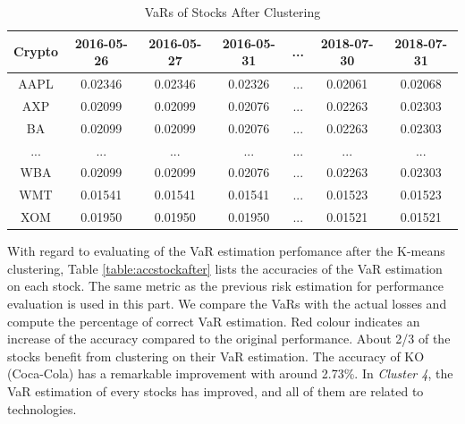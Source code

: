 \documentclass[11pt]{article} %
\theoremstyle{plain}
\theoremstyle{definition}
\begin{document}
{
  \begin{table}[ht]
    \centering
    \small
    \begin{tabular}{|c|c c c c c c|}
        \hline
        Crypto & 2016-05-26 & 2016-05-27 & 2016-05-31 & ... & 2018-07-30 & 2018-07-31 \\ [0.5ex]
        \hline
        AAPL & 0.02346 & 0.02346 & 0.02326 & ... & 0.02061 & 0.02068 \\
        \hline
        AXP & 0.02099 & 0.02099 & 0.02076 & ... & 0.02263 & 0.02303 \\
        \hline
        BA & 0.02099 & 0.02099 & 0.02076 & ... & 0.02263 & 0.02303 \\
        \hline
        ... & ... & ... & ... & ... & ... & ... \\
        \hline
        WBA & 0.02099 & 0.02099 & 0.02076 & ... & 0.02263 & 0.02303 \\
        \hline
        WMT & 0.01541 & 0.01541 & 0.01541 & ... & 0.01523 & 0.01523 \\
        \hline
        XOM & 0.01950 & 0.01950 & 0.01950 & ... & 0.01521 & 0.01521 \\
        \hline
    \end{tabular}
    \caption{VaRs of Stocks After Clustering}
    \label{table:varstockafter}
  \end{table}
}

With regard to evaluating of the VaR estimation perfomance after the K-means clustering, Table \ref{table:accstockafter} lists the accuracies of the VaR estimation on each stock. The same metric as the previous risk estimation for performance evaluation is used in this part. We compare the VaRs with the actual losses and compute the percentage of correct VaR estimation. Red colour indicates an increase of the accuracy compared to the original performance. About 2/3 of the stocks benefit from clustering on their VaR estimation. The accuracy of KO (Coca-Cola) has a remarkable improvement with around 2.73\%. In \textsl{Cluster 4}, the VaR estimation of every stocks has improved, and all of them are related to technologies.
\end{document}
